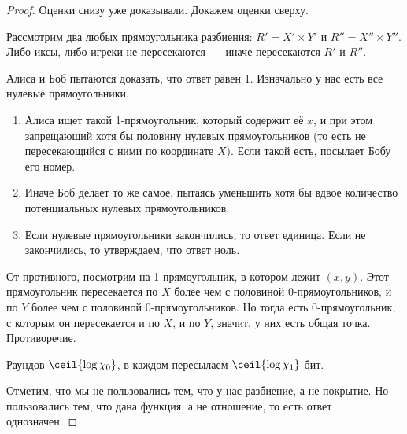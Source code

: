 \begin{proof}
    Оценки снизу уже доказывали. Докажем оценки сверху.

    Рассмотрим два любых прямоугольника разбиения: $R' = X' \times Y'$ и $R'' = X'' \times Y''$. Либо
    иксы, либо игреки не пересекаются~--- иначе пересекаются $R'$ и $R''$.

    Алиса и Боб пытаются доказать, что ответ равен 1. Изначально у нас есть все нулевые прямоугольники.

    \begin{enumerate}
        \item Алиса ищет такой 1-прямоугольник, который содержит её $x$, и при этом запрещающий хотя бы
            половину нулевых прямоугольников (то есть не пересекающийся с ними по координате $X$). Если
            такой есть, посылает Бобу его номер.
        \item Иначе Боб делает то же самое, пытаясь уменьшить хотя бы вдвое количество потенциальных
            нулевых прямоугольников.
        \item Если нулевые прямоугольники закончились, то ответ единица. Если не закончились, то
            утверждаем, что ответ ноль.
    \end{enumerate}

    От противного, посмотрим на 1-прямоугольник, в котором лежит $(x, y)$. Этот прямоугольник
    пересекается по $X$ более чем с половиной 0-прямоугольников, и по $Y$ более чем с половиной
    0-прямоугольников. Но тогда есть 0-прямоугольник, с которым он пересекается и по $X$, и по $Y$,
    значит, у них есть общая точка. Противоречие.

    Раундов $\ceil{\log \chi_0}$, в каждом пересылаем $\ceil{\log \chi_1}$ бит.

    Отметим, что мы не пользовались тем, что у нас разбиение, а не покрытие. Но пользовались тем, что
    дана функция, а не отношение, то есть ответ однозначен.
\end{proof}